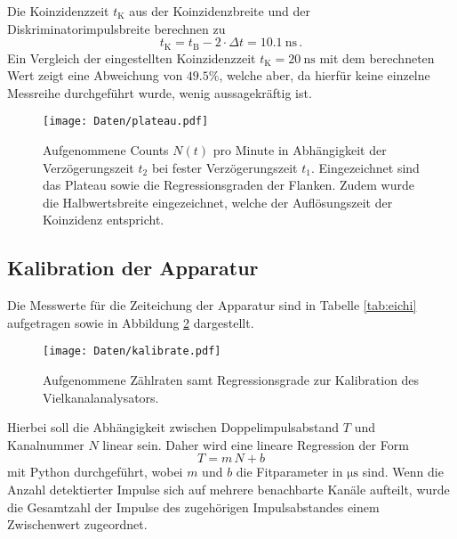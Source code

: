 Die Koinzidenzzeit $t_{\text{K}}$ aus der Koinzidenzbreite und der Diskriminatorimpulsbreite berechnen zu
\begin{equation}
	t_{\text{K}}=t_{\text{B}}-2\cdot\Delta t=\SI{10.1}{\nano\second}\,\text{.}
\end{equation}
Ein Vergleich der eingestellten Koinzidenzzeit $t_{\text{K}}=\SI{20}{\nano\second}$ mit dem berechneten Wert zeigt eine Abweichung von  $\num{49.5}\%$, welche aber, da hierfür keine einzelne Messreihe durchgeführt wurde, wenig aussagekräftig ist.


\begin{figure}
  \centering
  \texttt{[image: Daten/plateau.pdf]}
	\caption{Aufgenommene Counts $N(t)$ pro Minute in Abhängigkeit der Verzögerungszeit $t_2$ bei fester Verzögerungszeit $t_1$. Eingezeichnet sind das Plateau sowie die Regressionsgraden der Flanken. Zudem wurde die Halbwertsbreite eingezeichnet, welche der Auflösungszeit der Koinzidenz entspricht.}
  \label{fig:plateau}
\end{figure}


\FloatBarrier
\subsection{Kalibration der Apparatur}
\label{sec:blaaaaaaa}
Die Messwerte für die Zeiteichung der Apparatur sind in Tabelle
\ref{tab:eichi} aufgetragen sowie in Abbildung \ref{fig:eichi} dargestellt.
\begin{figure}
  \centering
  \texttt{[image: Daten/kalibrate.pdf]}
	\caption{Aufgenommene Zählraten samt Regressionsgrade zur Kalibration des Vielkanalanalysators.}
  \label{fig:eichi}
\end{figure}

Hierbei soll die Abhängigkeit zwischen Doppelimpulsabstand $T$ und Kanalnummer $N$ linear sein.
Daher wird eine lineare Regression der Form
\begin{equation}
	T = m \, N + b
\end{equation}
mit Python \cite{numpy} durchgeführt, wobei $m$ und $b$ die Fitparameter in $\si{\micro\second}$
sind.
Wenn die Anzahl detektierter Impulse sich auf mehrere benachbarte Kanäle aufteilt, wurde die Gesamtzahl der Impulse des zugehörigen Impulsabstandes einem Zwischenwert zugeordnet.

